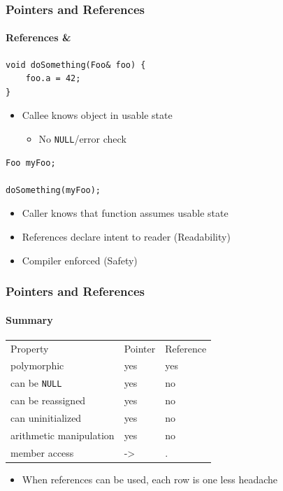 \documentclass[table]{beamer}
\newcommand{\declarelesson}{\textbf{\color{themegreen}{Lesson:}} }
\begin{document}
\begin{frame}[fragile]
    \frametitle{\declarelesson Pointers and References}
    \framesubtitle{References \&}
    \begin{lstlisting}[title=Function declaration]
void doSomething(Foo& foo) {
    foo.a = 42;
}
    \end{lstlisting}
    \begin{itemize}
        \item Callee knows object in usable state
            \begin{itemize}
                \item No \texttt{NULL}/error check
            \end{itemize}
    \end{itemize}
    \begin{lstlisting}[title=Function call]
Foo myFoo;

doSomething(myFoo);
    \end{lstlisting}
    \begin{itemize}
        \item Caller knows that function assumes usable state
        \item References declare intent to reader (\alert{Readability})
        \item Compiler enforced (\alert{Safety})
    \end{itemize}
\end{frame}

\begin{frame}
    \frametitle{\declarelesson Pointers and References}
    \framesubtitle{Summary}
    \begin{table}[tl]
        \begin{tabular}{p{4.5cm}p{2.5cm}p{2.5cm}}
            \rowcolor{codebg}
            \color{white} Property & \color{white} Pointer & \color{white}  Reference \\
                       polymorphic & yes & yes \\
              can be \texttt{NULL} & yes & no \\
                 can be reassigned & yes & no \\
                 can uninitialized & yes & no \\
           arithmetic manipulation & yes & no \\
                     member access & -> & . \\
        \end{tabular}
    \end{table}
    \begin{itemize}
        \item When references can be used, each row is one less headache
    \end{itemize}
\end{frame}
\end{document}
